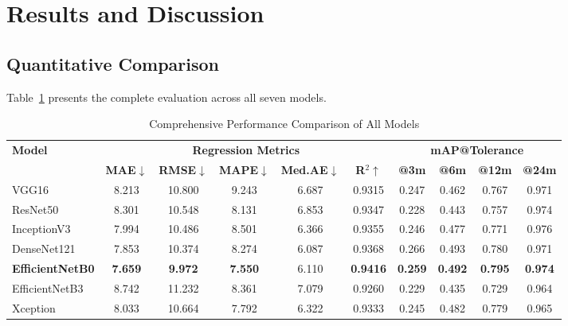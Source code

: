 \documentclass[conference]{IEEEtran}
\begin{document}
\section{Results and Discussion}

\subsection{Quantitative Comparison}

Table~\ref{tab:full_metrics} presents the complete evaluation across
all seven models.

\begin{table}[t]
\centering
\caption{Comprehensive Performance Comparison of All Models}
\label{tab:full_metrics}
\renewcommand{\arraystretch}{1.3}
\begin{tabular}{lccccccccc}
\toprule
\multirow{2}{*}{\textbf{Model}} &
\multicolumn{5}{c}{\textbf{Regression Metrics}} &
\multicolumn{4}{c}{\textbf{mAP@Tolerance}} \\
\cmidrule(lr){2-6}\cmidrule(lr){7-10}
 & \textbf{MAE$\downarrow$} & \textbf{RMSE$\downarrow$} & \textbf{MAPE$\downarrow$}
 & \textbf{Med.AE$\downarrow$} & \textbf{R$^2$$\uparrow$}
 & \textbf{@3m} & \textbf{@6m} & \textbf{@12m} & \textbf{@24m} \\
\midrule
VGG16           & 8.213 & 10.800 & 9.243 & 6.687 & 0.9315 & 0.247 & 0.462 & 0.767 & 0.971 \\
ResNet50        & 8.301 & 10.548 & 8.131 & 6.853 & 0.9347 & 0.228 & 0.443 & 0.757 & 0.974 \\
InceptionV3     & 7.994 & 10.486 & 8.501 & 6.366 & 0.9355 & 0.246 & 0.477 & 0.771 & 0.976 \\
DenseNet121     & 7.853 & 10.374 & 8.274 & 6.087 & 0.9368 & 0.266 & 0.493 & 0.780 & 0.971 \\
\textbf{EfficientNetB0} & \textbf{7.659} & \textbf{9.972} & \textbf{7.550} & 6.110 & \textbf{0.9416} & \textbf{0.259} & \textbf{0.492} & \textbf{0.795} & \textbf{0.974} \\
EfficientNetB3  & 8.742 & 11.232 & 8.361 & 7.079 & 0.9260 & 0.229 & 0.435 & 0.729 & 0.964 \\
Xception        & 8.033 & 10.664 & 7.792 & 6.322 & 0.9333 & 0.245 & 0.482 & 0.779 & 0.965 \\
\bottomrule
\end{tabular}

\vspace{4pt}


\end{table}
\end{document}
